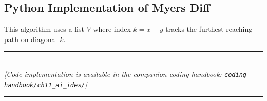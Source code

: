 \subsection{Python Implementation of Myers Diff}
This algorithm uses a list $V$ where index $k = x - y$ tracks the furthest reaching path on diagonal $k$.


\begin{center}
\noindent\rule{0.6\textwidth}{0.4pt} \\
\vspace{0.3em}
\textit{[Code implementation is available in the companion coding handbook: \texttt{coding-handbook/ch11\_ai\_ides/}]} \\
\noindent\rule{0.6\textwidth}{0.4pt}
\end{center}

